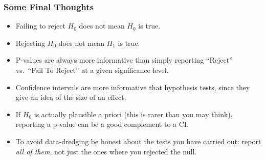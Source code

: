 \documentclass[handout]{beamer}
\begin{document}
\begin{frame}
\frametitle{Some Final Thoughts}
	\begin{itemize}
		\item Failing to reject $H_0$ does not mean $H_0$ is true. 
		\item Rejecting $H_0$ does not mean $H_1$ is true.
		\item P-values are always more informative than simply reporting ``Reject'' vs.\ ``Fail To Reject'' at a given significance level. 
		\item Confidence intervals are more informative that hypothesis tests, since they give an idea of the size of an effect. 
		\item If $H_0$ is actually plausible a priori (this is rarer than you may think), reporting a p-value can be a good complement to a CI. 
		\item To avoid data-dredging be honest about the tests you have carried out: report \emph{all of them}, not just the ones where you rejected the null.
	\end{itemize}

\end{frame}
\end{document}
